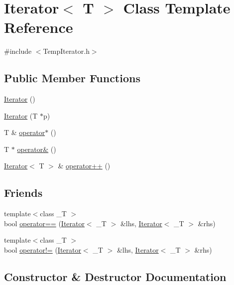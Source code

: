 \hypertarget{class_iterator}{}\section{Iterator$<$ T $>$ Class Template Reference}
\label{class_iterator}


{\ttfamily \#include $<$Temp\+Iterator.\+h$>$}

\subsection*{Public Member Functions}
\begin{DoxyCompactItemize}
\item 
\hyperlink{class_iterator_a87d4af70ba6312e91e1ab6a7c9e2ec6d}{Iterator} ()
\item 
\hyperlink{class_iterator_a9c3353bb547e0577a7e0db347c0b10e1}{Iterator} (T $\ast$p)
\item 
T \& \hyperlink{class_iterator_a31a9915829a895b5e28707671acbc94a}{operator$\ast$} ()
\item 
T $\ast$ \hyperlink{class_iterator_a841ce211854aa73a95fcfc0716099290}{operator\&} ()
\item 
\hyperlink{class_iterator}{Iterator}$<$ T $>$ \& \hyperlink{class_iterator_aeb34c80997916ed2561271a7ed56014f}{operator++} ()
\end{DoxyCompactItemize}
\subsection*{Friends}
\begin{DoxyCompactItemize}
\item 
{\footnotesize template$<$class \+\_\+T $>$ }\\bool \hyperlink{class_iterator_a039f78c73b5c74cf9a70df1df979345e}{operator==} (\hyperlink{class_iterator}{Iterator}$<$ \+\_\+T $>$ \&lhs, \hyperlink{class_iterator}{Iterator}$<$ \+\_\+T $>$ \&rhs)
\item 
{\footnotesize template$<$class \+\_\+T $>$ }\\bool \hyperlink{class_iterator_abfe7f47698f961015253c76cda143f1e}{operator!=} (\hyperlink{class_iterator}{Iterator}$<$ \+\_\+T $>$ \&lhs, \hyperlink{class_iterator}{Iterator}$<$ \+\_\+T $>$ \&rhs)
\end{DoxyCompactItemize}


\subsection{Constructor \& Destructor Documentation}
